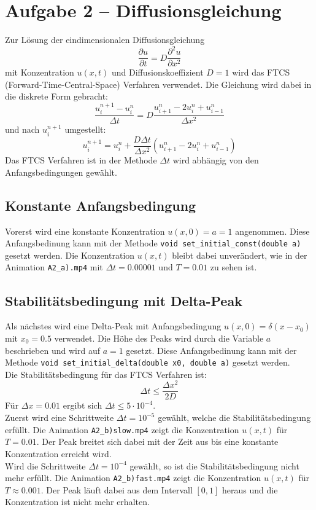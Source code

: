 \section{Aufgabe 2 – Diffusionsgleichung}
\label{sec:A2}
Zur Lösung der eindimensionalen Diffusionsgleichung
\begin{equation}
    \frac{\partial u}{\partial t} = D \frac{\partial^2 u}{\partial x^2}
\end{equation}
mit Konzentration $u(x,t)$ und Diffusionskoeffizient $D=1$ wird das FTCS (Forward-Time-Central-Space) Verfahren verwendet.
Die Gleichung wird dabei in die diskrete Form gebracht:
\begin{equation}
    \frac{u_{i}^{n+1}-u_{i}^{n}}{\Delta t} = D \frac{u_{i+1}^{n}-2u_{i}^{n}+u_{i-1}^{n}}{\Delta x^2}
\end{equation}
und nach $u_{i}^{n+1}$ umgestellt:
\begin{equation}
    u_{i}^{n+1} = u_{i}^{n} + \frac{D \Delta t}{\Delta x^2} (u_{i+1}^{n}-2u_{i}^{n}+u_{i-1}^{n})
\end{equation}
Das FTCS Verfahren ist in der Methode $\Delta t$ wird abhängig von den Anfangsbedingungen gewählt.

\subsection{Konstante Anfangsbedingung}
Vorerst wird eine konstante Konzentration $u(x,0)=a=1$ angenommen.
Diese Anfangsbedinung kann mit der Methode \texttt{void set\_initial\_const(double a)} gesetzt werden.
Die Konzentration $u(x,t)$ bleibt dabei unverändert, wie in der Animation \texttt{A2\_a).mp4} mit $\Delta t = 0.00001$ und $T = 0.01$ zu sehen ist.

\subsection{Stabilitätsbedingung mit Delta-Peak}
Als nächstes wird eine Delta-Peak mit Anfangsbedingung $u(x,0)=\delta(x-x_0)$ mit $x_0=0.5$ verwendet.
Die Höhe des Peaks wird durch die Variable $a$ beschrieben und wird auf $a=1$ gesetzt.
Diese Anfangsbedinung kann mit der Methode \texttt{void set\_initial\_delta(double x0, double a)} gesetzt werden.
\\
Die Stabilitätsbedingung für das FTCS Verfahren ist:
\begin{equation}
    \Delta t \leq \frac{\Delta x^2}{2D}
\end{equation}
Für $\Delta x = 0.01$ ergibt sich $\Delta t \leq 5 \cdot 10^{-4}$.
\\
Zuerst wird eine Schrittweite $\Delta t = 10^{-5}$ gewählt, welche die Stabilitätsbedingung erfüllt.
Die Animation \texttt{A2\_b)slow.mp4} zeigt die Konzentration $u(x,t)$ für $T=0.01$.
Der Peak breitet sich dabei mit der Zeit aus bis eine konstante Konzentration erreicht wird.
\\
Wird die Schrittweite $\Delta t = 10^{-4}$ gewählt, so ist die Stabilitätsbedingung nicht mehr erfüllt.
Die Animation \texttt{A2\_b)fast.mp4} zeigt die Konzentration $u(x,t)$ für $T\approx 0.001$.
Der Peak läuft dabei aus dem Intervall $[0,1]$ heraus und die Konzentration ist nicht mehr erhalten.

